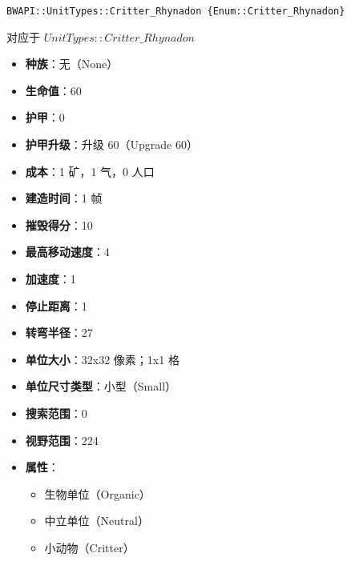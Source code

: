 \begin{tcolorbox}[colback=white, colframe=black!60!white, title=Critter\_Rhynadon(), arc=0mm]
    \begin{verbatim}
BWAPI::UnitTypes::Critter_Rhynadon {Enum::Critter_Rhynadon}
    \end{verbatim}
    对应于  $UnitTypes::Critter\_Rhynadon$ 
    \begin{itemize}
        \item \textbf{种族}：无（None）
        \item \textbf{生命值}：60
        \item \textbf{护甲}：0
        \item \textbf{护甲升级}：升级 60（Upgrade 60）
        \item \textbf{成本}：1 矿，1 气，0 人口
        \item \textbf{建造时间}：1 帧
        \item \textbf{摧毁得分}：10
        \item \textbf{最高移动速度}：4
        \item \textbf{加速度}：1
        \item \textbf{停止距离}：1
        \item \textbf{转弯半径}：27
        \item \textbf{单位大小}：32x32 像素；1x1 格
        \item \textbf{单位尺寸类型}：小型（Small）
        \item \textbf{搜索范围}：0
        \item \textbf{视野范围}：224
        \item \textbf{属性}：
            \begin{itemize}
                \item 生物单位（Organic）
                \item 中立单位（Neutral）
                \item 小动物（Critter）
            \end{itemize}
    \end{itemize}
\end{tcolorbox}

